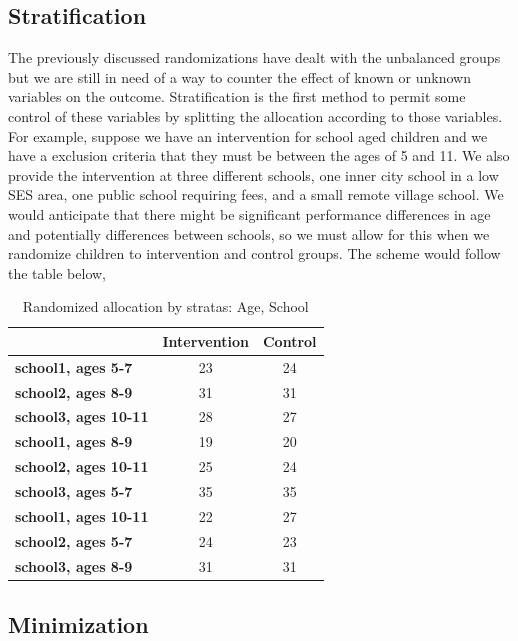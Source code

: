 \documentclass[]{book}
\begin{document}
\hypertarget{stratification}{%
\subsection{Stratification}\label{stratification}}

The previously discussed randomizations have dealt with the unbalanced groups but we are still in need of a way to counter the effect of known or unknown variables on the outcome. Stratification is the first method to permit some control of these variables by splitting the allocation according to those variables. For example, suppose we have an intervention for school aged children and we have a exclusion criteria that they must be between the ages of 5 and 11. We also provide the intervention at three different schools, one inner city school in a low SES area, one public school requiring fees, and a small remote village school. We would anticipate that there might be significant performance differences in age and potentially differences between schools, so we must allow for this when we randomize children to intervention and control groups. The scheme would follow the table below,

\begin{table}[t]

\caption{\label{tab:strattable}Randomized allocation by stratas: Age, School}
\centering
\begin{tabular}{>{\bfseries}lcc}
\toprule
  & Intervention & Control\\
\midrule
\rowcolor{gray!6}  school1, ages 5-7 & 23 & 24\\
school2, ages 8-9 & 31 & 31\\
\rowcolor{gray!6}  school3, ages 10-11 & 28 & 27\\
school1, ages 8-9 & 19 & 20\\
\rowcolor{gray!6}  school2, ages 10-11 & 25 & 24\\
\addlinespace
school3, ages 5-7 & 35 & 35\\
\rowcolor{gray!6}  school1, ages 10-11 & 22 & 27\\
school2, ages 5-7 & 24 & 23\\
\rowcolor{gray!6}  school3, ages 8-9 & 31 & 31\\
\bottomrule
\end{tabular}
\end{table}

\hypertarget{minimization}{%
\subsection{Minimization}\label{minimization}}
\end{document}
